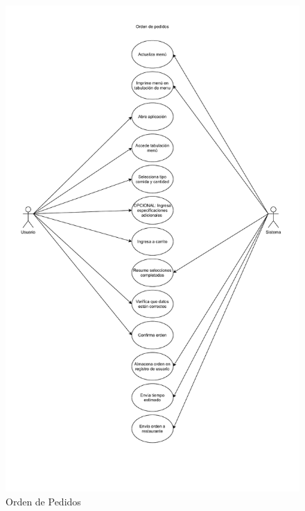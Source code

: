 \documentclass[conference]{IEEEtran}
\begin{document}
\begin{figure}[H]
\centering
\includegraphics[scale=0.23]{imagenes/DCU Orden de Pedidos1.pdf}
\caption{ Orden de Pedidos}
\end{figure}
\end{document}
